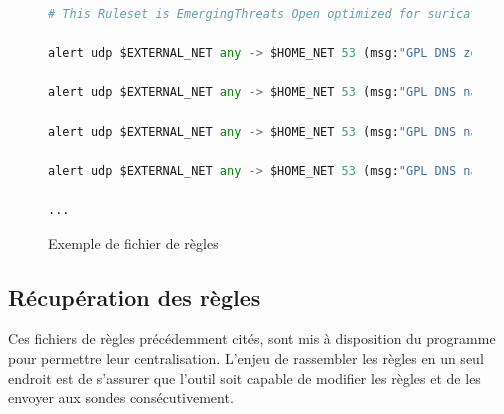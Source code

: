 \begin{figure}[h]%
    \center%
\begin{lstlisting}[language=Python]
# This Ruleset is EmergingThreats Open optimized for suricata-7.0.3-enhanced.

alert udp $EXTERNAL_NET any -> $HOME_NET 53 (msg:"GPL DNS zone transfer UDP"; content:"|00 00 FC|"; offset:14; reference:cve,1999-0532; reference:nessus,10595; classtype:attempted-recon; sid:2101948; rev:8; metadata:created_at 2010_09_23, cve CVE_1999_0532, updated_at 2019_07_26;)

alert udp $EXTERNAL_NET any -> $HOME_NET 53 (msg:"GPL DNS named version attempt"; content:"|07|version"; offset:12; nocase; content:"|04|bind|00|"; offset:12; nocase; reference:nessus,10028; classtype:attempted-recon; sid:2101616; rev:9; metadata:created_at 2010_09_23, updated_at 2019_07_26;)

alert udp $EXTERNAL_NET any -> $HOME_NET 53 (msg:"GPL DNS named iquery attempt"; content:"|09 80 00 00 00 01 00 00 00 00|"; depth:16; offset:2; reference:bugtraq,134; reference:cve,1999-0009; reference:url,www.rfc-editor.org/rfc/rfc1035.txt; classtype:attempted-recon; sid:2100252; rev:9; metadata:created_at 2010_09_23, cve CVE_1999_0009, updated_at 2019_07_26;)

alert udp $EXTERNAL_NET any -> $HOME_NET 53 (msg:"GPL DNS named authors attempt"; content:"|07|authors"; offset:12; nocase; content:"|04|bind|00|"; offset:12; nocase; reference:nessus,10728; classtype:attempted-recon; sid:2100256; rev:8; metadata:created_at 2010_09_23, updated_at 2019_07_26;)

...
\end{lstlisting}
    \caption[Exemple de fichier de règles (source: \href{https://rules.emergingthreats.net/open/suricata-7.0.3/rules/emerging-dns.rules}{emerging-dns.rules})]{Exemple de fichier de règles}\label{fig:ExampleRulesFile.png}
\end{figure}


\newpage

\subsection{Récupération des règles}

\vspace{1em}

Ces fichiers de règles précédemment cités, sont mis à disposition du programme pour permettre leur centralisation. L'enjeu de rassembler les règles en un seul endroit est de s'assurer que l'outil soit capable de modifier les règles et de les envoyer aux sondes consécutivement.\\

